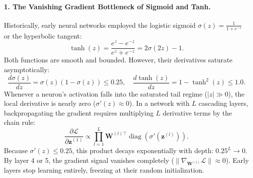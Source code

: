 \paragraph{1. The Vanishing Gradient Bottleneck of Sigmoid and Tanh.}
Historically, early neural networks employed the logistic sigmoid $\sigma(z) = \frac{1}{1 + e^{-z}}$ or the hyperbolic tangent:
\begin{equation}
\tanh(z) = \frac{e^z - e^{-z}}{e^z + e^{-z}} = 2\sigma(2z) - 1.
\end{equation}
Both functions are smooth and bounded. However, their derivatives saturate asymptotically:
\begin{equation}
\frac{d\sigma(z)}{dz} = \sigma(z)(1 - \sigma(z)) \le 0.25, \quad \frac{d\tanh(z)}{dz} = 1 - \tanh^2(z) \le 1.0.
\end{equation}
Whenever a neuron's activation falls into the saturated tail regime ($|z| \gg 0$), the local derivative is nearly zero ($\sigma'(z) \approx 0$). In a network with $L$ cascading layers, backpropagating the gradient requires multiplying $L$ derivative terms by the chain rule:
\begin{equation}
\frac{\partial \mathcal{L}}{\partial \mathbf{z}^{(1)}} \propto \prod_{l=1}^L \mathbf{W}^{(l)\top} \operatorname{diag}\left( \sigma'(\mathbf{z}^{(l)}) \right).
\end{equation}
Because $\sigma'(z) \le 0.25$, this product decays exponentially with depth: $0.25^L \to 0$. By layer 4 or 5, the gradient signal vanishes completely ($\|\nabla_{\mathbf{W}^{(1)}} \mathcal{L}\| \approx 0$). Early layers stop learning entirely, freezing at their random initialization.

